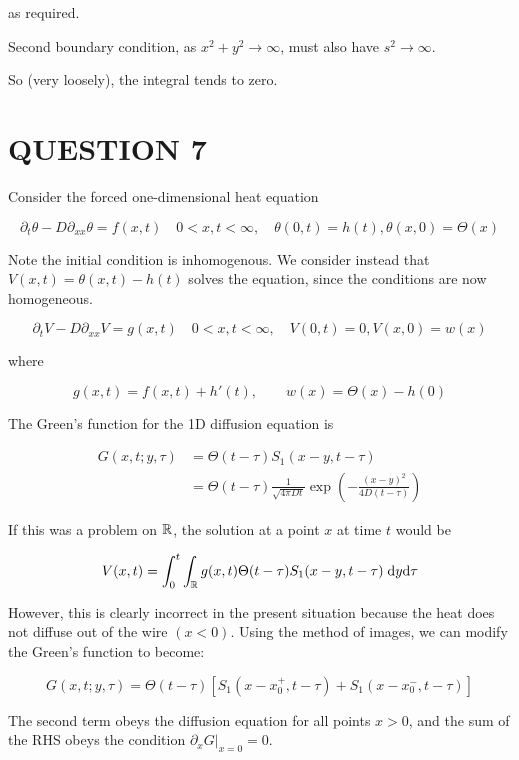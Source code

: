 \documentclass[a4paper]{article}
\begin{document}
as required.

Second boundary condition, as $ x^{2} + y^{2} \to \infty $, must also have $ s^{2} \to \infty $.

So (very loosely), the integral tends to zero. 









\section{QUESTION 7}

Consider the forced one-dimensional heat equation

\[ \partial_{t} \theta - D \partial_{xx} \theta = f(x,t) \quad 0 < x,t < \infty, \quad \theta(0,t) = h(t), \theta(x,0) = \Theta(x)  \]

Note the initial condition is inhomogenous. We consider instead that $ V(x,t) = \theta(x,t) - h(t) $ solves the equation, since the conditions are now homogeneous.


\[ \partial_{t} V - D \partial_{xx} V= g(x,t) \quad 0 < x,t < \infty, \quad V(0,t) = 0, V(x,0) = w(x)  \]

where

\[ g(x,t) = f(x,t) + h'(t), \qquad w(x) = \Theta(x) - h(0) \]

The Green's function for the 1D diffusion equation is

\begin{align*}
G(x,t; y,\tau) & = \Theta(t-\tau) S_{1}(x-y,t-\tau) \\
& = \Theta(t-\tau) \frac{1}{\sqrt{4 \pi D t}} \exp \left(   - \frac{(x-y)^{2}}{4 D (t - \tau)} \right) 
\end{align*}

If this was a problem on $ \mathbb{R} $, the solution at a point $ x $ at time $ t $ would be

\[ V(x,t) = \int_{0}^{t} \int_{\mathbb{R}} g(x,t) \Theta(t-\tau) S_{1}(x-y,t-\tau) \; \mathrm{d} y \mathrm{d} \tau \]

However, this is clearly incorrect in the present situation because the heat does not diffuse out of the wire $ (x < 0) $.
Using the method of images, we can modify the Green's function to become:

\[ G(x,t; y,\tau) = \Theta(t-\tau) [ S_{1}(x-x_{0}^{+},t-\tau) + S_{1}(x-x_{0}^{-},t-\tau) ] \]

The second term obeys the diffusion equation for all points $ x > 0 $, and the sum of the RHS obeys the condition $ \partial_{x} G |_{x = 0} = 0 $. 
\end{document}
